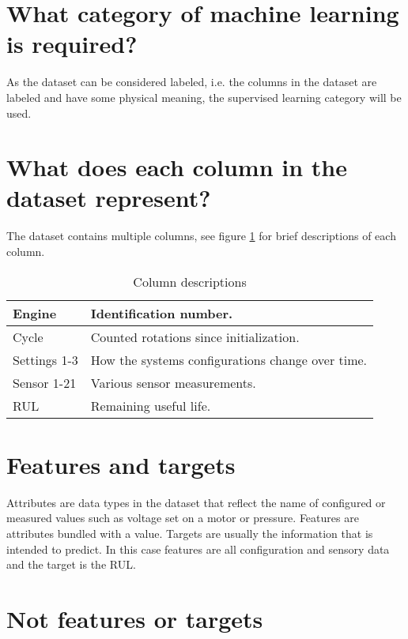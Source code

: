 \documentclass[%
oneside,    %
project,    %
nosummary   %
]{USN-MSc}
\begin{document}
\section{What category of machine learning is required?}
\label{sec:mlCategory}
As the dataset can be considered labeled, i.e. the columns in the dataset are labeled and have some physical meaning, the supervised learning category will be used.

\section{What does each column in the dataset represent?}
\label{sec:datasetColumns}
The dataset contains multiple columns, see figure \ref{tab:columnDescr} for brief descriptions of each column.

\begin{table}[!ht]
  \caption{Column descriptions}
  \centering
  \begin{tabular}{ | m{3cm} | m{10cm} |}
    \hline
    Engine       & Identification number.                           \\ \hline
    Cycle        & Counted rotations since initialization.          \\ \hline
    Settings 1-3 & How the systems configurations change over time. \\ \hline
    Sensor 1-21  & Various sensor measurements.                     \\ \hline
    RUL          & Remaining useful life.                           \\ \hline
  \end{tabular}
  \label{tab:columnDescr}
\end{table}

\section{Features and targets}
\label{sec:featuresTargets}
Attributes are data types in the dataset that reflect the name of configured or measured values such as voltage set on a motor or pressure. Features are attributes bundled with a value. Targets are usually the information that is intended to predict. In this case features are all configuration and sensory data and the target is the RUL.

\section{Not features or targets}
\label{sec:notFeaturesTargets}
\end{document}
